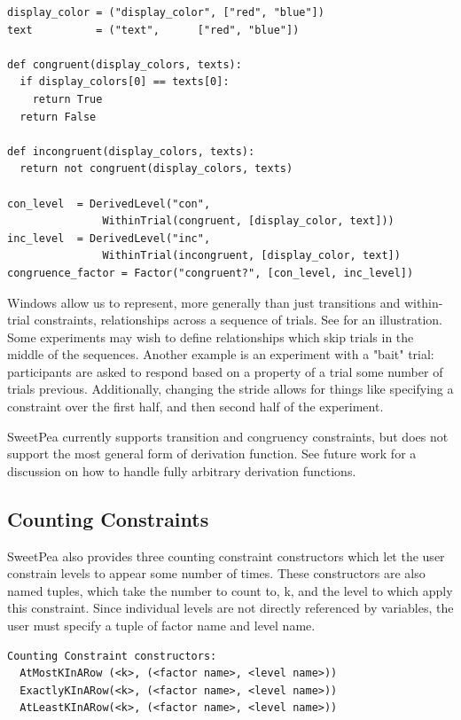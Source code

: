 \begin{verbatim}
display_color = ("display_color", ["red", "blue"])
text          = ("text",      ["red", "blue"])

def congruent(display_colors, texts):
  if display_colors[0] == texts[0]:
    return True
  return False

def incongruent(display_colors, texts):
  return not congruent(display_colors, texts)

con_level  = DerivedLevel("con",
               WithinTrial(congruent, [display_color, text]))
inc_level  = DerivedLevel("inc",
               WithinTrial(incongruent, [display_color, text])
congruence_factor = Factor("congruent?", [con_level, inc_level])
\end{verbatim}

Windows allow us to represent, more generally than just transitions and within-trial constraints, relationships across a sequence of trials. See  for an illustration. Some experiments may wish to define relationships which skip trials in the middle of the sequences. Another example is an experiment with a "bait" trial: participants are asked to respond based on a property of a trial some number of trials previous. Additionally, changing the stride allows for things like specifying a constraint over the first half, and then second half of the experiment.

SweetPea currently supports transition and congruency constraints, but does not support the most general form of derivation function. See future work for a discussion on how to handle fully arbitrary derivation functions.

\subsection{Counting Constraints}
SweetPea also provides three counting constraint constructors which let the user constrain levels to appear some number of times. These constructors are also named tuples, which take the number to count to, k, and the level to which apply this constraint. Since individual levels are not directly referenced by variables, the user must specify a tuple of factor name and level name.

\begin{verbatim}
Counting Constraint constructors:
  AtMostKInARow (<k>, (<factor name>, <level name>))
  ExactlyKInARow(<k>, (<factor name>, <level name>))
  AtLeastKInARow(<k>, (<factor name>, <level name>))
\end{verbatim}

